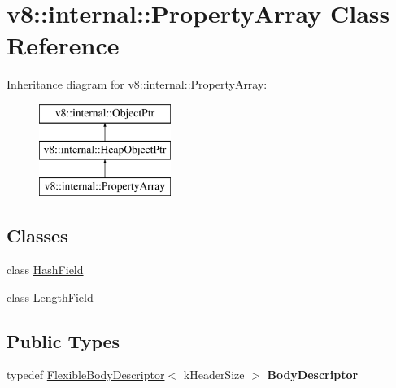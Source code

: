 \hypertarget{classv8_1_1internal_1_1PropertyArray}{}\section{v8\+:\+:internal\+:\+:Property\+Array Class Reference}
\label{classv8_1_1internal_1_1PropertyArray}
Inheritance diagram for v8\+:\+:internal\+:\+:Property\+Array\+:\begin{figure}[H]
\begin{center}
\leavevmode
\includegraphics[height=3.000000cm]{classv8_1_1internal_1_1PropertyArray}
\end{center}
\end{figure}
\subsection*{Classes}
\begin{DoxyCompactItemize}
\item 
class \mbox{\hyperlink{classv8_1_1internal_1_1PropertyArray_1_1HashField}{Hash\+Field}}
\item 
class \mbox{\hyperlink{classv8_1_1internal_1_1PropertyArray_1_1LengthField}{Length\+Field}}
\end{DoxyCompactItemize}
\subsection*{Public Types}
\begin{DoxyCompactItemize}
\item 
\mbox{\label{classv8_1_1internal_1_1PropertyArray_a32d025b29e9e52cef90129d831456d73}} 
typedef \mbox{\hyperlink{classv8_1_1internal_1_1FlexibleBodyDescriptor}{Flexible\+Body\+Descriptor}}$<$ k\+Header\+Size $>$ {\bfseries Body\+Descriptor}
\end{DoxyCompactItemize}

